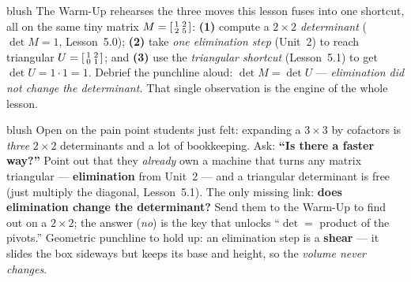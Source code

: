 \documentclass[10pt]{article}
\begin{document}
\begin{fixedskillbox}{blush}
    The Warm-Up rehearses the three moves this lesson fuses into one shortcut, all on the same tiny
    matrix $M=\begin{bsmallmatrix} 1 & 2\\ 2 & 5 \end{bsmallmatrix}$:
    \textbf{(1)} compute a \emph{$2\times2$ determinant} ($\det M=1$, Lesson~5.0);
    \textbf{(2)} take \emph{one elimination step} (Unit~2) to reach triangular $U=\begin{bsmallmatrix} 1 & 2\\ 0 & 1 \end{bsmallmatrix}$;
    and \textbf{(3)} use the \emph{triangular shortcut} (Lesson~5.1) to get $\det U=1\cdot1=1$. Debrief the
    punchline aloud: $\det M=\det U$ --- \emph{elimination did not change the determinant.} That single
    observation is the engine of the whole lesson.
\end{fixedskillbox}

\begin{skillbox}[Hook]{blush}
    Open on the pain point students just felt: expanding a $3\times3$ by cofactors is \emph{three}
    $2\times2$ determinants and a lot of bookkeeping. Ask: \textbf{``Is there a faster way?''} Point out
    that they \emph{already} own a machine that turns any matrix triangular --- \textbf{elimination}
    from Unit~2 --- and a triangular determinant is free (just multiply the diagonal, Lesson~5.1). The
    only missing link: \textbf{does elimination change the determinant?} Send them to the Warm-Up to
    find out on a $2\times2$; the answer (\emph{no}) is the key that unlocks ``$\det=$ product of the
    pivots.'' Geometric punchline to hold up: an elimination step is a \textbf{shear} --- it slides the
    box sideways but keeps its base and height, so the \emph{volume never changes}.
\end{skillbox}
\end{document}
